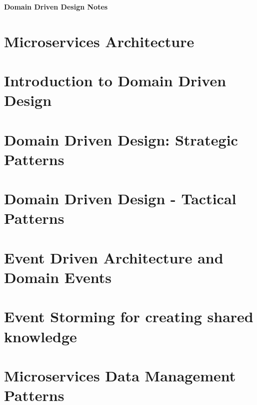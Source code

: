 \documentclass[a4paper, 11pt]{book}
\begin{document}
    \begin{titlepage}
        \centering
        \vspace*{2in}
        \Huge \textbf{Domain Driven Design Notes}
    \end{titlepage}

    \setcounter{section}{0}

    \newpage

    \tableofcontents
    \newpage

    \listoffigures
    \newpage

    \chapter{Microservices Architecture}
    

    \chapter{Introduction to Domain Driven Design}
    

    \chapter{Domain Driven Design: Strategic Patterns}
    

    \chapter{Domain Driven Design - Tactical Patterns}
    

    \chapter{Event Driven Architecture and Domain Events}
    

    \chapter{Event Storming for creating shared knowledge}
    

    \chapter{Microservices Data Management Patterns}
    
\end{document}
